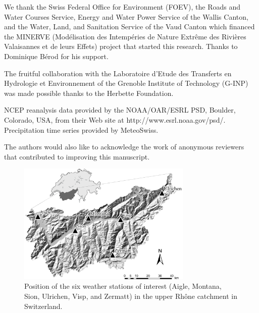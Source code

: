 \documentclass[hess, manuscript]{copernicus}
\begin{document}
		
	
	
	
	\begin{acknowledgements}
		We thank the Swiss Federal Office for Environment (FOEV), the Roads and Water Courses Service, Energy and Water Power Service of the Wallis Canton, and the Water, Land, and Sanitation Service of the Vaud Canton which financed the MINERVE (Mod\'{e}lisation des Intemp\'{e}ries de Nature Extr\^{e}me des Rivi\`{e}res Valaisannes et de leurs Effets) project that started this research. Thanks to Dominique B\'{e}rod for his support.
		
		The fruitful collaboration with the Laboratoire d'Etude des Transferts en Hydrologie et Environnement of the Grenoble Institute of Technology (G-INP) was made possible thanks to the Herbette Foundation. 
		
		NCEP reanalysis data provided by the NOAA/OAR/ESRL PSD, Boulder, Colorado, USA, from their Web site at http://www.esrl.noaa.gov/psd/. Precipitation time series provided by MeteoSwiss.
		
		The authors would also like to acknowledge the work of anonymous reviewers that contributed to improving this manuscript. 
	\end{acknowledgements}
	
	
	
	
	
	
	
	
	
	
	\begin{figure}[htb]
		\begin{center}
			\includegraphics[width=8.3cm]{fig01.pdf}
		\end{center}
		\caption{Position of the six weather stations of interest (Aigle, Montana, Sion, Ulrichen, Visp, and Zermatt) in the upper Rh\^{o}ne catchment in Switzerland.}
		\label{fig:map}
	\end{figure}
	
\end{document}

